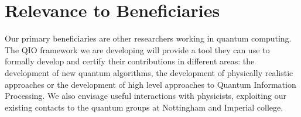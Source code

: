 \documentclass[a4paper]{article}
\begin{document}



\section{Relevance to Beneficiaries}

Our primary beneficiaries are other researchers working in quantum
computing. The QIO framework we are developing will provide a tool
they can use to formally develop and certify their contributions in
different areas: the development of new quantum algorithms, the
development of physically realistic approaches or the development of
high level approaches to Quantum Information Processing. We also
envisage useful interactions with physicists, exploiting our existing
contacts to the quantum groups at Nottingham and Imperial college.
\end{document}

